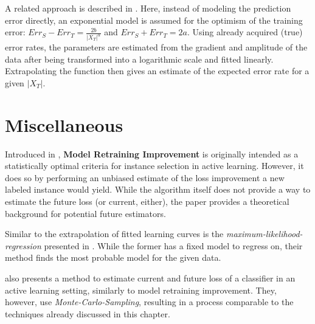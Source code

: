 A related approach is described in \cite{CortesEtal1993}. Here, instead of modeling the prediction error directly, an exponential model is assumed for the optimism of the training error: $Err_S - Err_T = \frac{2b}{|X_T|^\alpha}$ and $Err_S + Err_T = 2a$. Using already acquired (true) error rates, the parameters are estimated from the gradient and amplitude of the data after being transformed into a logarithmic scale and fitted linearly. Extrapolating the function then gives an estimate of the expected error rate for a given $|X_T|$.

\section{Miscellaneous}
Introduced in \cite{EvansEtAl2015}, \textbf{Model Retraining Improvement} is originally intended as a statistically optimal criteria for instance selection in active learning. However, it does so by performing an unbiased estimate of the loss improvement a new labeled instance would yield. While the algorithm itself does not provide a way to estimate the future loss (or current, either), the paper provides a theoretical background for potential future estimators.

Similar to the extrapolation of fitted learning curves is the \textit{maximum-likelihood-regression} presented in \cite{KadieEtal1995}. While the former has a fixed model to regress on, their method finds the most probable model for the given data.

\cite{RoyEtAl2001} also presents a method to estimate current and future loss of a classifier in an active learning setting, similarly to model retraining improvement. They, however, use \textit{Monte-Carlo-Sampling}, resulting in a process comparable to the techniques already discussed in this chapter.